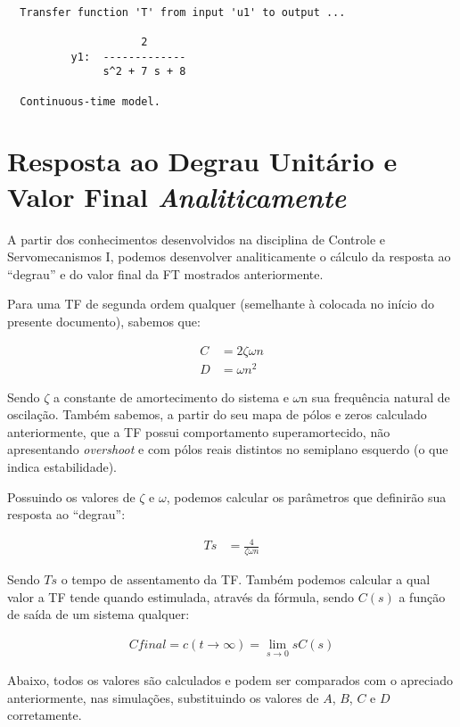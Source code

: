 \documentclass[
	article,			%
	11pt,				%
	oneside,			%
	a4paper,			%
	english,			%
	brazil,				%
	sumario=tradicional
	]{abntex2}
\begin{document}
\begin{verbatim}

  Transfer function 'T' from input 'u1' to output ...

                     2
          y1:  -------------
               s^2 + 7 s + 8

  Continuous-time model.

\end{verbatim}

\section{Resposta ao Degrau Unitário e Valor Final \emph{Analiticamente}}

A partir dos conhecimentos desenvolvidos na disciplina de Controle e Servomecanismos I, podemos desenvolver analiticamente
o cálculo da resposta ao ``degrau'' e do valor final da FT mostrados anteriormente.

Para uma TF de segunda ordem qualquer (semelhante à colocada no início do presente documento), sabemos que:

\begin{align*}
  C &= 2\zeta\omega n \\
  D &= \omega n^2
\end{align*}

Sendo ${\zeta}$ a constante de amortecimento do sistema e ${\omega}$n sua frequência natural de oscilação. Também sabemos, a partir do seu mapa de pólos e zeros calculado anteriormente, que a TF possui comportamento superamortecido, não apresentando \emph{overshoot} e com pólos reais distintos no semiplano esquerdo (o que indica estabilidade).

Possuindo os valores de ${\zeta}$ e ${\omega}$, podemos calcular os parâmetros que definirão sua resposta ao ``degrau'':

\begin{align*}
  Ts &= \frac{4}{\zeta\omega n}
\end{align*}

Sendo ${Ts}$ o tempo de assentamento da TF. Também podemos calcular a qual valor a TF tende quando estimulada, através da fórmula, sendo ${C(s)}$ a função de saída de um sistema qualquer:

\begin{align*}
  Cfinal = c(t\to\infty) = \lim_{s\to 0} sC(s)
\end{align*}

Abaixo, todos os valores são calculados e podem ser comparados com o apreciado anteriormente, nas simulações, substituindo os valores de ${A}$, ${B}$, ${C}$ e ${D}$ corretamente.
\end{document}
